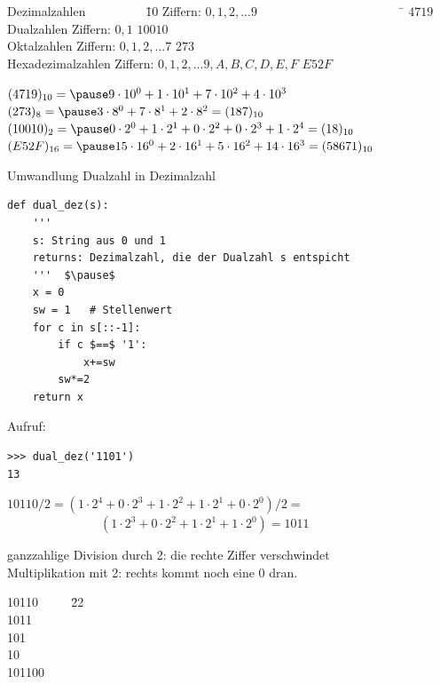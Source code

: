 \documentclass[10pt]{beamer}
\begin{document}
\begin{frame}[fragile]

\begin{tabbing} Dezimalzahlen~~~~~~~~~ \= 10 Ziffern: $0,1,2, ... 9$ 
~~~~~~~~~~~~~~~~~~~~~~~\=  $4719$  \\   
Dualzahlen  Ziffern: $0,1$ \>$10010$ \\  
Oktalzahlen  Ziffern: $0,1,2, ... 7$  \>  $273$ \\  
Hexadezimalzahlen  Ziffern: $0,1,2, ... 9, A, B, C, D, E, F$ \>$E52F$
 \end{tabbing} \pause

$(4719)_{10} = \pause  9 \cdot 10^0 + 1 \cdot 10^1 + 7 \cdot 10^2 + 4 \cdot 10^3$ \\  
$(273)_{8} = \pause 3 \cdot 8^0 + 7 \cdot 8^1 + 2 \cdot 8^2 = (187)_{10}$\\  
$(10010)_{2} =  \pause 0 \cdot 2^0 + 1 \cdot 2^1 + 0 \cdot 2^2 + 0 \cdot 2^3 + 1 \cdot 2^4 = (18)_{10}$ \\  
$(E52F)_{16} = \pause 15 \cdot 16^0 + 2 \cdot 16^1 + 5 \cdot 16^2 + 14 \cdot 16^3 = (58671)_{10}$

\end{frame}

\begin{frame}[fragile]
Umwandlung Dualzahl in Dezimalzahl

\begin{lstlisting}[mathescape=true]
def dual_dez(s):  
    '''
    s: String aus 0 und 1
    returns: Dezimalzahl, die der Dualzahl s entspicht
    '''  $\pause$
    x = 0
    sw = 1   # Stellenwert
    for c in s[::-1]:
        if c $==$ '1':
            x+=sw
        sw*=2
    return x
\end{lstlisting} 

Aufruf: 
\begin{lstlisting}
>>> dual_dez('1101')
13  
\end{lstlisting} 
\end{frame}

\begin{frame}[fragile]
$10110 / 2   =  ( 1 \cdot 2^4 +  0 \cdot 2^3 + 1 \cdot 2^2 + 1 \cdot 2^1 + 0 \cdot 2^0 ) / 2 = $\\ 
~~~~~~~~~~~~~~~$(1 \cdot 2^3 + 0 \cdot 2^2 + 1 \cdot 2^1 + 1 \cdot 2^0 ) = 1011$ \pause

ganzzahlige Division durch 2: \pause  die rechte Ziffer verschwindet \\
Multiplikation mit 2: \pause rechts kommt noch eine 0 dran. 


\begin{tabbing}
10110 ~~~~ \= 22 \\
1011  \pause {} \\
101 \pause {} \\
10  \pause {} \\
101100  \pause {}
 \end{tabbing}

\end{frame}
\end{document}
